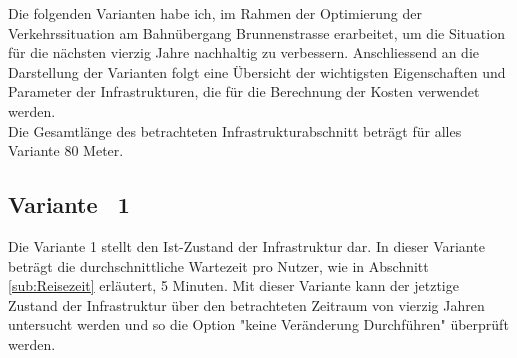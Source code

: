 %
%
%
%


Die folgenden Varianten habe ich, im Rahmen der Optimierung der Verkehrssituation am Bahnübergang Brunnenstrasse erarbeitet, um die Situation für die nächsten vierzig Jahre nachhaltig zu verbessern. Anschliessend an die Darstellung der Varianten folgt eine Übersicht der wichtigsten Eigenschaften und Parameter der Infrastrukturen, die für die Berechnung der Kosten verwendet werden. \\
Die Gesamtlänge des betrachteten Infrastrukturabschnitt beträgt für alles Variante 80 Meter.


\subsection{Variante \ 1}
\label{subsec:V1}
	
Die Variante 1 stellt den Ist-Zustand der Infrastruktur dar. In dieser Variante beträgt die durchschnittliche Wartezeit pro Nutzer, wie in Abschnitt \ref{sub:Reisezeit} erläutert, 5 Minuten.  Mit dieser Variante kann der jetztige Zustand der Infrastruktur über den betrachteten Zeitraum von vierzig Jahren untersucht werden und so die Option "keine Veränderung Durchführen" überprüft werden. 



